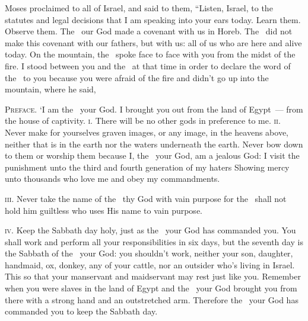 
\begin{inparaenum}
   Moses proclaimed to all of Israel, and said to them, ``Listen, Israel, to the statutes and legal decisions that I am speaking into your ears today. Learn them. Observe them.%
   The \lord\ our God made a covenant with us in Horeb.%
   The \lord\ did not make this covenant with our fathers, but with us: all of us who are here and alive today.%
   On the mountain, the \lord\ spoke face to face with you from the midst of the fire.%
   I stood between you and the \lord\ at that time in order to declare the word of the \lord\ to you because you were afraid of the fire and didn't go up into the mountain, where he said,%
  
   \textsc{Preface.} `I am the \lord\ your God. I brought you out from the land of Egypt~--- from the house of captivity.%
   \textsc{i.} There will be no other gods in preference to me.%
   \textsc{ii.} Never make for yourselves graven images, or any image, in the heavens above, neither that is in the earth nor the waters underneath the earth.%
   Never bow down to them or worship them because I, the \lord\ your God, am a jealous God: I visit the punishment unto the third and fourth generation of my haters%
   Showing mercy unto thousands who love me and obey my commandments.%
  
   \textsc{iii.} Never take the name of the \lord\ thy God with vain purpose for the \lord\ shall not hold him guiltless who uses His name to vain purpose.%
  
   \textsc{iv.} Keep the Sabbath day holy, just as the \lord\ your God has commanded you.%
   You shall work and perform all your responsibilities in six days,%
   but the seventh day is the Sabbath of the \lord\ your God: you shouldn't work, neither your son, daughter, handmaid, ox, donkey, any of your cattle, nor an outsider who's living in Israel. This so that your manservant and maidservant may rest just like you.%
   Remember when you were slaves in the land of Egypt and the \lord\ your God brought you from there with a strong hand and an outstretched arm. Therefore the \lord\ your God has commanded you to keep the Sabbath day.%
  

\end{inparaenum}
